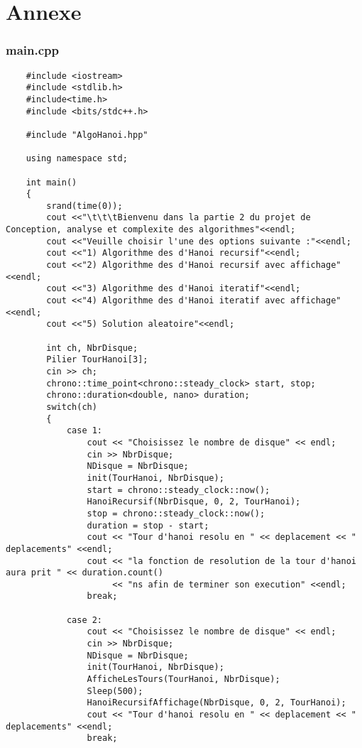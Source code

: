\chapter{Annexe}

\subsection{main.cpp}
\begin{verbatim}
    #include <iostream>
    #include <stdlib.h>
    #include<time.h>
    #include <bits/stdc++.h>
    
    #include "AlgoHanoi.hpp"
    
    using namespace std;
    
    int main()
    {
        srand(time(0));
        cout <<"\t\t\tBienvenu dans la partie 2 du projet de Conception, analyse et complexite des algorithmes"<<endl;
        cout <<"Veuille choisir l'une des options suivante :"<<endl;
        cout <<"1) Algorithme des d'Hanoi recursif"<<endl;
        cout <<"2) Algorithme des d'Hanoi recursif avec affichage"<<endl;
        cout <<"3) Algorithme des d'Hanoi iteratif"<<endl;
        cout <<"4) Algorithme des d'Hanoi iteratif avec affichage"<<endl;
        cout <<"5) Solution aleatoire"<<endl;
    
        int ch, NbrDisque;
        Pilier TourHanoi[3];
        cin >> ch;
        chrono::time_point<chrono::steady_clock> start, stop;
        chrono::duration<double, nano> duration;
        switch(ch)
        {
            case 1:
                cout << "Choisissez le nombre de disque" << endl;
                cin >> NbrDisque;
                NDisque = NbrDisque;
                init(TourHanoi, NbrDisque);
                start = chrono::steady_clock::now();
                HanoiRecursif(NbrDisque, 0, 2, TourHanoi);
                stop = chrono::steady_clock::now();
                duration = stop - start;
                cout << "Tour d'hanoi resolu en " << deplacement << " deplacements" <<endl;
                cout << "la fonction de resolution de la tour d'hanoi aura prit " << duration.count()
                     << "ns afin de terminer son execution" <<endl;
                break;
    
            case 2:
                cout << "Choisissez le nombre de disque" << endl;
                cin >> NbrDisque;
                NDisque = NbrDisque;
                init(TourHanoi, NbrDisque);
                AfficheLesTours(TourHanoi, NbrDisque);
                Sleep(500);
                HanoiRecursifAffichage(NbrDisque, 0, 2, TourHanoi);
                cout << "Tour d'hanoi resolu en " << deplacement << " deplacements" <<endl;
                break;
    

\end{verbatim}
